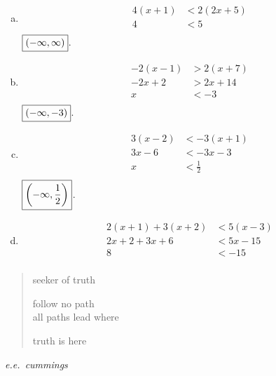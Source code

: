 \documentclass[letterpaper, landscape]{exam}
\begin{document}
\begin{description}
\begin{enumerate}[(a)]
          \item
            \begin{align*}
              4(x + 1) & < 2(2x + 5) \\
              4        & < 5 \\
            \end{align*}
            $\boxed{ \intoo{ -\infty, \infty } }$.

          \item
            \begin{align*}
              -2(x - 1) & > 2(x + 7) \\
              -2x + 2   & > 2x + 14\\
              x         & < -3\\
            \end{align*}
            $\boxed{ \intoo{ -\infty, -3 } }$.

          \item
            \begin{align*}
              3(x - 2) & < -3(x + 1) \\
              3x - 6   & < -3x - 3 \\
              x        & < \frac{1}{2} \\
            \end{align*}
            $\boxed{ \intoo{ -\infty, \frac{1}{2} } }$.

          \item
            \begin{align*}
              2(x + 1) + 3(x + 2) & < 5(x - 3) \\
              2x + 2 + 3x + 6     & < 5x - 15 \\
              8                   & < -15 \\
            \end{align*}

        \end{enumerate}
    \end{description}
  \fi

  \ifprintanswers{}
  \else
    \vspace{12 cm}

    \begin{verse}
      seeker of truth

      follow no path \\
      all paths lead where

      truth is here 
    \end{verse}
    \hspace{2 cm} {\em e.e.\ cummings\/}

    \newpage

  \fi
\end{document}
